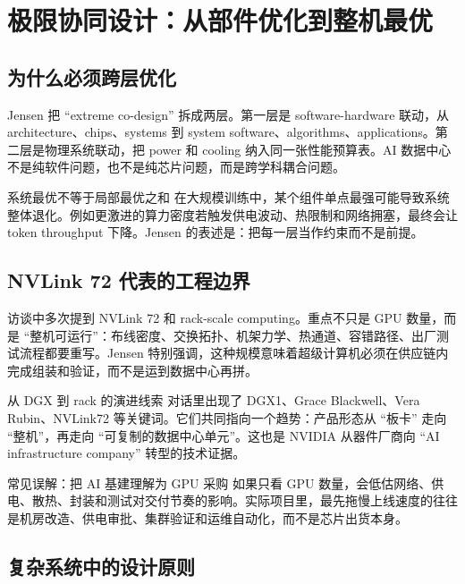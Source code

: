 \section{极限协同设计：从部件优化到整机最优}

\subsection{为什么必须跨层优化}

Jensen 把 ``extreme co-design'' 拆成两层。第一层是 software-hardware 联动，从 architecture、chips、systems 到 system software、algorithms、applications。第二层是物理系统联动，把 power 和 cooling 纳入同一张性能预算表。AI 数据中心不是纯软件问题，也不是纯芯片问题，而是跨学科耦合问题。

\begin{importantbox}{系统最优不等于局部最优之和}
在大规模训练中，某个组件单点最强可能导致系统整体退化。例如更激进的算力密度若触发供电波动、热限制和网络拥塞，最终会让 token throughput 下降。Jensen 的表述是：把每一层当作约束而不是前提。
\end{importantbox}

\subsection{NVLink 72 代表的工程边界}

访谈中多次提到 NVLink 72 和 rack-scale computing。重点不只是 GPU 数量，而是 ``整机可运行''：布线密度、交换拓扑、机架力学、热通道、容错路径、出厂测试流程都要重写。Jensen 特别强调，这种规模意味着超级计算机必须在供应链内完成组装和验证，而不是运到数据中心再拼。

\begin{knowledgebox}{从 DGX 到 rack 的演进线索}
对话里出现了 DGX1、Grace Blackwell、Vera Rubin、NVLink72 等关键词。它们共同指向一个趋势：产品形态从 ``板卡'' 走向 ``整机''，再走向 ``可复制的数据中心单元''。这也是 NVIDIA 从器件厂商向 ``AI infrastructure company'' 转型的技术证据。
\end{knowledgebox}

\begin{warningbox}{常见误解：把 AI 基建理解为 GPU 采购}
如果只看 GPU 数量，会低估网络、供电、散热、封装和测试对交付节奏的影响。实际项目里，最先拖慢上线速度的往往是机房改造、供电审批、集群验证和运维自动化，而不是芯片出货本身。
\end{warningbox}

\subsection{复杂系统中的设计原则}

